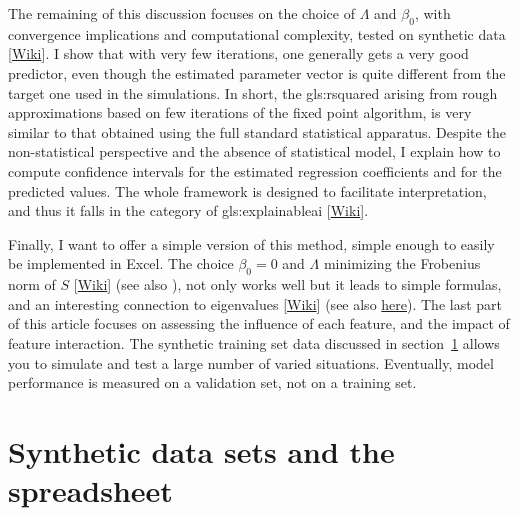 \documentclass[oneside,10pt]{book}
\begin{document}
The remaining of this discussion focuses on the choice of $\Lambda$ and $\beta_0$, with convergence implications and computational complexity, 
tested on \textcolor{index}{synthetic data} [\href{https://en.wikipedia.org/wiki/Synthetic_data}{Wiki}]. I show that with very few iterations, one generally gets a very good predictor, even though the estimated parameter vector is quite different from the target one used in the simulations. In short, the \gls{gls:rsquared} arising from rough approximations based on few iterations of the fixed point algorithm, is very similar to that obtained using the full standard statistical apparatus. Despite the non-statistical perspective and the absence of statistical model, I explain how to compute confidence intervals for the estimated regression coefficients and for the predicted values. The whole framework is designed to facilitate interpretation, 
and thus it falls in the category of \gls{gls:explainableai} [\href{https://en.wikipedia.org/wiki/Explainable_artificial_intelligence}{Wiki}].

Finally, I want to offer a simple version of this method, simple enough to easily be implemented in Excel. The choice $\beta_0=0$ and $\Lambda$ minimizing the 
\textcolor{index}{Frobenius norm} of $S$  [\href{https://en.wikipedia.org/wiki/Matrix_norm}{Wiki}] (see also \cite{numregxxx}), not only works well but it leads to simple formulas, and an interesting connection to \textcolor{index}{eigenvalues} [\href{https://en.wikipedia.org/wiki/Eigenvalues_and_eigenvectors}{Wiki}] 
(see also \href{https://mathoverflow.net/questions/421309/power-of-a-matrix-largest-eigenvalue-in-absolute-value-and-convergence-acceler}{here}). The last part of this article focuses on assessing the influence of each feature, and the impact of feature interaction. The synthetic training set data discussed in section~\ref{sr001} allows you to simulate and test a large number of varied situations. Eventually, model performance is measured on a validation set, not on a training set.


\section{Synthetic data sets and the spreadsheet}\label{sr001}
\end{document}
